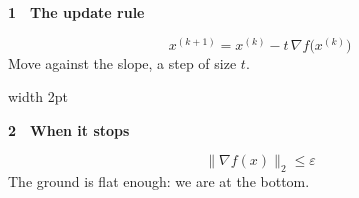\documentclass{article}
\newcommand{\head}[2]{{\color{org}\Huge\bfseries #1}\ \ {\color{navy}\LARGE\bfseries #2}\par\vspace{10pt}}
\newcommand{\note}[1]{{\color{grey}\Large #1}\par}
\begin{document}
\color{navy}\LARGE
\begin{minipage}[t]{0.47\linewidth}
  \head{1}{The update rule}
  \[ x^{(k+1)} = x^{(k)} - t\,\nabla f\big(x^{(k)}\big) \]
  \note{Move against the slope, a step of size $t$.}
\end{minipage}\hfill{\color{navy}\vrule width 2pt}\hfill
\begin{minipage}[t]{0.47\linewidth}
  \head{2}{When it stops}
  \[ \|\nabla f(x)\|_2 \le \varepsilon \]
  \note{The ground is flat enough: we are at the bottom.}
\end{minipage}
\end{document}

